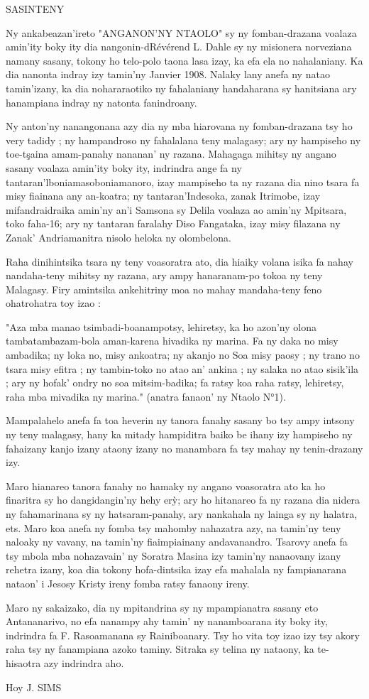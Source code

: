 
SASINTENY

Ny ankabeazan'ireto "ANGANON'NY NTAOLO" sy ny fomban-drazana voalaza amin'ity boky ity dia nangonin-dRévérend 
L. Dahle sy ny misionera norveziana namany sasany, tokony ho telo-polo taona lasa izay, ka efa ela no nahalaniany. 
Ka dia nanonta indray izy tamin'ny Janvier 1908. Nalaky lany anefa ny natao tamin'izany, 
ka dia nohararaotiko ny fahalaniany handaharana sy hanitsiana ary hanampiana indray ny natonta fanindroany.

Ny anton'ny nanangonana azy dia ny mba hiarovana ny fomban-drazana tsy ho very tadidy ; 
ny hampandroso ny fahalalana teny malagasy; ary ny hampiseho ny toe-tşaina amam-panahy nananan' ny razana.
Mahagaga mihitsy ny angano sasany voalaza amin'ity boky ity, 
indrindra ange fa ny tantaran'lboniamasoboniamanoro, izay mampiseho
ta ny razana dia nino tsara fa misy fiainana any an-koatra; ny tantaran'Indesoka, 
zanak Itrimobe, izay mifandraidraika amin'ny an'i Samsona sy
Delila voalaza ao amin'ny Mpitsara, toko faha-16; ary ny tantaran faralahy Diso Fangataka, 
izay misy filazana ny Zanak' Andriamanitra nisolo heloka ny olombelona.

Raha dinihintsika tsara ny teny voasoratra ato, dia hiaiky volana isika fa nahay nandaha-teny mihitsy ny razana,
ary ampy hanaranam-po tokoa ny teny Malagasy. 
Firy amintsika ankehitriny moa no mahay mandaha-teny feno ohatrohatra toy izao :

"Aza mba manao tsimbadi-boanampotsy, lehiretsy, ka ho azon'ny olona tambatambazam-bola 
aman-karena hivadika ny marina. Fa ny daka no misy ambadika; 
ny loka no, misy ankoatra; ny akanjo no Soa misy paosy ; ny trano no tsara misy efitra ; 
ny tambin-toko no atao an' ankina ; ny salaka no atao sisik'ila ; 
ary ny hofak' ondry no soa mitsim-badika; fa ratsy koa raha ratsy, lehiretsy, raha mba mivadika ny marina." 
(anatra fanaon' ny Ntaolo N°1).

Mampalahelo anefa fa toa heverin ny tanora fanahy sasany bo tsy ampy intsony ny teny malagasy, 
hany ka mitady hampiditra baiko be ihany izy hampiseho ny fahaizany kanjo izany ataony izany no manambara fa
tsy mahay ny tenin-drazany izy.

Maro hianareo tanora fanahy no hamaky ny angano voasoratra ato ka ho finaritra sy ho dangidangin'ny hehy erỳ; ary ho hitanareo fa ny razana dia nidera ny fahamarinana sy ny hatsaram-panahy, ary nankahala ny
lainga sy ny halatra, ets. Maro koa anefa ny fomba tsy mahomby nahazatra azy, na tamin'ny teny naloaky ny vavany, na tamin'ny fiaimpiainany andavanandro. Tsarovy anefa fa tsy mbola mba nohazavain' ny Soratra
Masina izy tamin'ny nanaovany izany rehetra izany, koa dia tokony hofa-dintsika izay efa mahalala ny fampianarana nataon' i Jesosy Kristy ireny
fomba ratsy fanaony ireny.

Maro ny sakaizako, dia ny mpitandrina sy ny mpampianatra sasany eto Antananarivo, 
no efa nanampy ahy tamin' ny nanamboarana ity boky ity, indrindra fa F. Rasoamanana sy Rainiboanary. 
Tsy ho vita toy izao izy tsy akory raha tsy ny fanampiana azoko taminy. Sitraka sy telina ny nataony, 
ka te-hisaotra azy indrindra aho.

Hoy J. SIMS